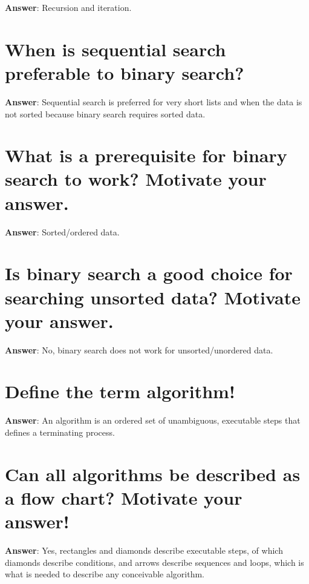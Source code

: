 \documentclass[a4paper,11pt,oneside]{book}
\begin{document}
\begin{sloppypar}
\textbf{Answer}: Recursion and iteration.



\section{When is sequential search preferable to binary search?}

\label{q:183:sa:en:True}

\textbf{Answer}: Sequential search is preferred for very short lists and when the data is not sorted because binary search requires sorted data.



\section{What is a prerequisite for binary search to work? Motivate your answer.}

\label{q:184:sa:en:True}

\textbf{Answer}: Sorted/ordered data.



\section{Is binary search a good choice for searching unsorted data? Motivate your answer.}

\label{q:185:sa:en:True}

\textbf{Answer}: No, binary search does not work for unsorted/unordered data.



\section{Define the term algorithm!}

\label{q:186:sa:en:True}

\textbf{Answer}: An algorithm is an ordered set of unambiguous, executable steps that defines a terminating process.



\section{Can all algorithms be described as a flow chart? Motivate your answer!}

\label{q:187:sa:en:True}

\textbf{Answer}: Yes, rectangles and diamonds describe executable steps, of which diamonds describe conditions, and arrows describe sequences and loops, which is what is needed to describe any conceivable algorithm.




\end{sloppypar}
\end{document}
